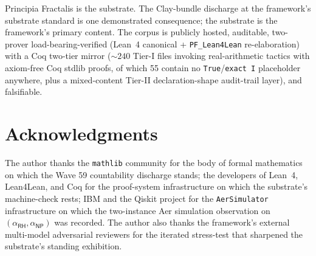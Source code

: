 \documentclass[11pt,a4paper]{amsart}
\theoremstyle{plain}
\theoremstyle{definition}
\begin{document}
Principia Fractalis is the substrate. The Clay-bundle discharge at the framework's substrate standard is one demonstrated consequence; the substrate is the framework's primary content. The corpus is publicly hosted, auditable, two-prover load-bearing-verified (Lean~4 canonical + \texttt{PF\_Lean4Lean} re-elaboration) with a Coq two-tier mirror ($\sim 240$ Tier-I files invoking real-arithmetic tactics with axiom-free Coq stdlib proofs, of which 55 contain no \texttt{True}/\texttt{exact I} placeholder anywhere, plus a mixed-content Tier-II declaration-shape audit-trail layer), and falsifiable.

\section*{Acknowledgments}

The author thanks the \texttt{mathlib} community for the body of formal mathematics on which the Wave 59 countability discharge stands; the developers of Lean~4, Lean4Lean, and Coq for the proof-system infrastructure on which the substrate's machine-check rests; IBM and the Qiskit project for the \texttt{AerSimulator} infrastructure on which the two-instance Aer simulation observation on $(\alpha_{\textsf{RH}},\alpha_{\textsf{NP}})$ was recorded. The author also thanks the framework's external multi-model adversarial reviewers for the iterated stress-test that sharpened the substrate's standing exhibition.

\end{document}
